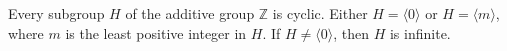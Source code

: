 \begin{theorem}
Every subgroup $H$ of the additive group $\mathbb{Z}$ is cyclic. Either $H = \langle 0 \rangle$ or $H = \langle m \rangle$, where $m$ is the least positive integer in $H$. If $H \neq \langle 0 \rangle$, then $H$ is infinite.
\end{theorem}
